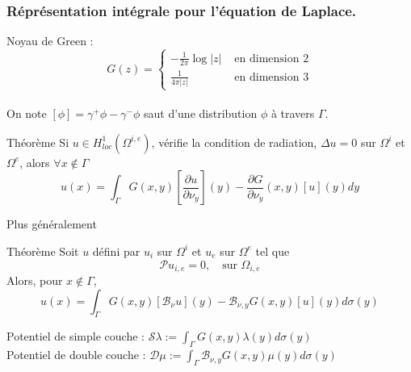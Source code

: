 \documentclass[11pt]{beamer}
\begin{document}
	\begin{frame}
		\frametitle{Réprésentation intégrale pour l'équation de Laplace.}
		Noyau de Green : 
		\[G(z) = \begin{cases}
		- \frac{1}{2\pi} \log |z| & \text{ en dimension } 2\\
		 \frac{1}{4\pi|z|} & \text{ en dimension } 3
		\end{cases}\]\\
		On note $\left[\phi\right] = \gamma^+ \phi - \gamma^- \phi$ saut d'une distribution $\phi$ à travers $\Gamma$. 
		\begin{block}{Théorème}
			Si $u\in H^1_{loc}(\Omega^{i,e})$, vérifie la condition de radiation, $\Delta u = 0$ sur $\Omega^i$ et $\Omega^e$, alors $\forall x \notin \Gamma$
			\[u(x) = \int_{\Gamma}G(x,y)\left[\dfrac{\partial{u}}{\partial \nu_y}\right](y) - \dfrac{\partial G}{\partial \nu_y}(x,y)\left[u\right](y) dy  \]
		\end{block}
		
	\end{frame}
	\begin{frame}{Plus généralement}
		\begin{block}{Théorème}
			Soit $u$ défini par $u_{i}$ sur $\Omega^i$ et $u_e$  sur $\Omega^e$ tel que 
			\[\mathcal{P}u_{i,e} = 0, \quad \text{sur } \Omega_{i,e}\] 
			Alors, pour $x\notin \Gamma$, 
			\[u(x) = \int_{\Gamma} G(x,y) \left[\mathcal{B}_\nu u\right](y)- \mathcal{B}_{\nu,y}G(x,y) \left[u\right](y) d\sigma(y) \] 
		\end{block}
		
		\begin{Definition}
			Potentiel de simple couche : $\mathcal{S} \lambda := \int_{\Gamma} G(x,y) \lambda(y) d\sigma(y)$\\
			Potentiel de double couche : $\mathcal{D} \mu := \int_{\Gamma} {\mathcal{B}}_{\nu,y}G(x,y) \mu(y) d\sigma(y)$
		\end{Definition} 
	\end{frame}
\end{document}
